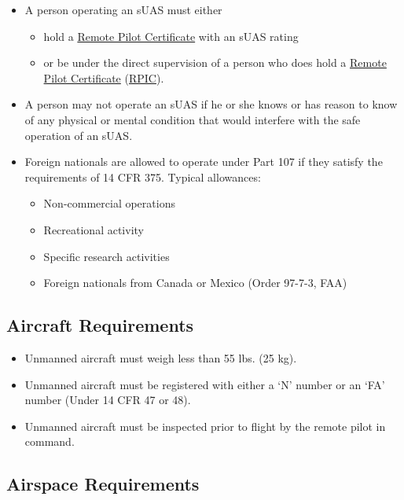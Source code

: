 \documentclass[
]{book}
\providecommand{\tightlist}{%
  \setlength{\itemsep}{0pt}\setlength{\parskip}{0pt}}
\begin{document}
\begin{itemize}
\item
  A person operating an sUAS must either

  \begin{itemize}
  \tightlist
  \item
    hold a \protect\hyperlink{RPC}{Remote Pilot Certificate} with an sUAS rating
  \item
    or be under the direct supervision of a person who does hold a \protect\hyperlink{RPC}{Remote Pilot Certificate} (\protect\hyperlink{RPIC}{RPIC}).
  \end{itemize}
\item
  A person may not operate an sUAS if he or she knows or has reason to know of any physical or mental condition that would interfere with the safe operation of an sUAS.
\item
  Foreign nationals are allowed to operate under Part 107 if they satisfy the requirements of 14 CFR 375. Typical allowances:

  \begin{itemize}
  \tightlist
  \item
    Non-commercial operations
  \item
    Recreational activity
  \item
    Specific research activities
  \item
    Foreign nationals from Canada or Mexico (Order 97-7-3, FAA)
  \end{itemize}
\end{itemize}

\hypertarget{ss-aircraft}{%
\subsection{Aircraft Requirements}\label{ss-aircraft}}

\begin{itemize}
\tightlist
\item
  Unmanned aircraft must weigh less than 55 lbs. (25 kg).
\item
  Unmanned aircraft must be registered with either a `N' number or an `FA' number (Under 14 CFR 47 or 48).
\item
  Unmanned aircraft must be inspected prior to flight by the remote pilot in command.
\end{itemize}

\hypertarget{airspace-requirements}{%
\subsection{Airspace Requirements}\label{airspace-requirements}}
\end{document}
